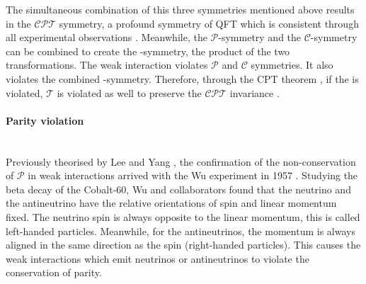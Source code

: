 The simultaneous combination of this three symmetries mentioned above results in the $\mathcal{CPT}$ symmetry, a profound symmetry of QFT which is
consistent through all experimental observations \cite{Moura:2022dev}. %
Meanwhile, the $\mathcal{P}$-symmetry and the $\mathcal{C}$-symmetry can be combined to create the \CP-symmetry, the product of the two transformations.
The weak interaction violates $\mathcal{P}$ and $\mathcal{C}$ symmetries. 
It also violates the combined \CP-symmetry. Therefore, through the CPT theorem \cite{Bell:1955djs}, if the \CP is violated,
$\mathcal{T}$ is violated as well to preserve the $\mathcal{CPT}$ invariance \cite{Streater:1989vi}. %

\paragraph{Parity violation}\mbox{}\\
Previously theorised by Lee and Yang \cite{Lee:1956qn}, the confirmation of the non-conservation of $\mathcal{P}$ in weak interactions 
arrived with the Wu experiment in 1957 \cite{Wu:1957my}. %
Studying the beta decay of the Cobalt-60, Wu and collaborators found that the neutrino 
and the antineutrino have the relative orientations of spin and linear momentum fixed.
The neutrino spin is always opposite to the linear momentum, this is called left-handed particles.
Meanwhile, for the antineutrinos, the momentum is always aligned in the same direction as the spin (right-handed particles).
This causes the weak interactions which emit neutrinos or antineutrinos to violate the conservation of parity.


